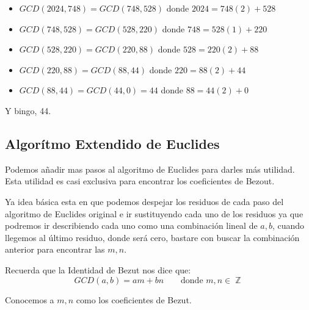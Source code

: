 \documentclass[12pt, fleqn]{report}                             %
\DeclareMathOperator \Space {\quad}                             %
\DeclareMathOperator \Integers  {\mathbb{Z}}                     %
\begin{document}
            \begin{itemize}
                \item $GCD(2024, 748) = GCD(748, 528)$   donde $2024=748(2)+528$

                \item $GCD(748, 528)  = GCD(528, 220)$   donde $748=528(1)+220$

                \item $GCD(528, 220)  = GCD(220, 88)$    donde $528=220(2)+88$

                \item $GCD(220, 88)   = GCD(88, 44)$     donde $220=88(2)+44$

                \item $GCD(88, 44)    = GCD(44, 0) = 44$ donde $88=44(2)+0$
            \end{itemize}

            Y bingo, 44.





        \clearpage
        \subsection{Algorítmo Extendido de Euclides}

            Podemos añadir mas pasos al algoritmo de Euclides para darles
            más utilidad. Esta utilidad es casi exclusiva para encontrar los
            coeficientes de Bezout.

            Ya idea básica esta en que podemos despejar los residuos de cada paso
            del algoritmo de Euclides original e ir sustituyendo cada uno de los residuos
            ya que podremos ir describiendo cada uno como una combinación lineal de $a,b$,
            cuando llegemos al último residuo, donde será cero, bastare con buscar la
            combinación anterior para encontrar las $m,n$.

            Recuerda que la Identidad de Bezut nos dice que:
            \begin{equation}
                GCD(a,b) = am +bn \Space \text{ donde } m, n \in \Integers
            \end{equation}

            Conocemos a $m,n$ como los coeficientes de Bezut.
\end{document}

